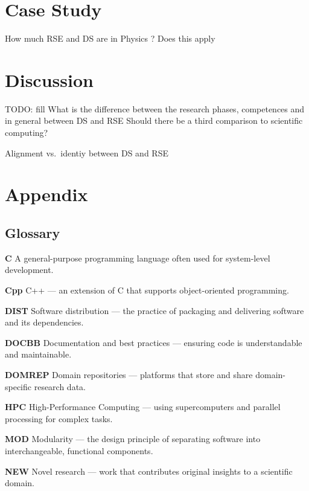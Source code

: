 \documentclass[
        english,biblatex
    ]{lni}
\begin{document}
    \section{Case Study}\label{case-study}

    How much RSE and DS are in Physics ? \textcite{florian} Does this
    apply

    \section{Discussion}\label{discussion}

    TODO: fill What is the difference between the research phases,
    competences and in general between DS and RSE Should there be a
    third comparison to scientific computing?

    Alignment vs.~identiy between DS and RSE

    \printbibliography

    \section{Appendix}\label{sec:appendix}

    \subsection{Glossary}\label{glossary}

    \textbf{C} A general-purpose programming language often used for
    system-level development.

    \textbf{Cpp} C++ --- an extension of C that supports object-oriented
    programming.

    \textbf{DIST} Software distribution --- the practice of packaging
    and delivering software and its dependencies.

    \textbf{DOCBB} Documentation and best practices --- ensuring code is
    understandable and maintainable.

    \textbf{DOMREP} Domain repositories --- platforms that store and
    share domain-specific research data.

    \textbf{HPC} High-Performance Computing --- using supercomputers and
    parallel processing for complex tasks.

    \textbf{MOD} Modularity --- the design principle of separating
    software into interchangeable, functional components.

    \textbf{NEW} Novel research --- work that contributes original
    insights to a scientific domain.
\end{document}
